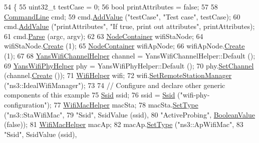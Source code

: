 \begin{DoxyCode}
54 \{
55   uint32\_t testCase = 0;
56   \textcolor{keywordtype}{bool} printAttributes = \textcolor{keyword}{false};
57 
58   \hyperlink{classns3_1_1CommandLine}{CommandLine} cmd;
59   cmd.\hyperlink{classns3_1_1CommandLine_addcfb546c7ad4c8bd0965654d55beb8e}{AddValue} (\textcolor{stringliteral}{"testCase"}, \textcolor{stringliteral}{"Test case"}, testCase);
60   cmd.\hyperlink{classns3_1_1CommandLine_addcfb546c7ad4c8bd0965654d55beb8e}{AddValue} (\textcolor{stringliteral}{"printAttributes"}, \textcolor{stringliteral}{"If true, print out attributes"}, printAttributes);
61   cmd.\hyperlink{classns3_1_1CommandLine_a5c10b85b3207e5ecb48d907966923156}{Parse} (argc, argv);
62 
63   \hyperlink{classns3_1_1NodeContainer}{NodeContainer} wifiStaNode;
64   wifiStaNode.\hyperlink{classns3_1_1NodeContainer_a787f059e2813e8b951cc6914d11dfe69}{Create} (1);
65   \hyperlink{classns3_1_1NodeContainer}{NodeContainer} wifiApNode;
66   wifiApNode.\hyperlink{classns3_1_1NodeContainer_a787f059e2813e8b951cc6914d11dfe69}{Create} (1);
67 
68   \hyperlink{classns3_1_1YansWifiChannelHelper}{YansWifiChannelHelper} channel = YansWifiChannelHelper::Default ();
69   \hyperlink{classns3_1_1YansWifiPhyHelper}{YansWifiPhyHelper} phy = YansWifiPhyHelper::Default ();
70   phy.\hyperlink{classns3_1_1YansWifiPhyHelper_ad2e9a27587dd4ff320435c93cc2676de}{SetChannel} (channel.\hyperlink{classns3_1_1YansWifiChannelHelper_a0532e292ab9452f3cf630c848708e563}{Create} ());
71   \hyperlink{classns3_1_1WifiHelper}{WifiHelper} wifi;
72   wifi.\hyperlink{classns3_1_1WifiHelper_a3d01b178aeb2de246ab5a3aa5638ce24}{SetRemoteStationManager} (\textcolor{stringliteral}{"ns3::IdealWifiManager"});
73 
74   \textcolor{comment}{// Configure and declare other generic components of this example}
75   \hyperlink{classns3_1_1Ssid}{Ssid} ssid;
76   ssid = \hyperlink{classns3_1_1Ssid}{Ssid} (\textcolor{stringliteral}{"wifi-phy-configuration"});
77   \hyperlink{classns3_1_1WifiMacHelper}{WifiMacHelper} macSta;
78   macSta.\hyperlink{classns3_1_1WifiMacHelper_a382d8df76a1dd7007179d1963b4b6bc6}{SetType} (\textcolor{stringliteral}{"ns3::StaWifiMac"},
79                   \textcolor{stringliteral}{"Ssid"}, SsidValue (ssid),
80                   \textcolor{stringliteral}{"ActiveProbing"}, \hyperlink{classns3_1_1BooleanValue}{BooleanValue} (\textcolor{keyword}{false}));
81   \hyperlink{classns3_1_1WifiMacHelper}{WifiMacHelper} macAp;
82   macAp.\hyperlink{classns3_1_1WifiMacHelper_a382d8df76a1dd7007179d1963b4b6bc6}{SetType} (\textcolor{stringliteral}{"ns3::ApWifiMac"},
83                  \textcolor{stringliteral}{"Ssid"}, SsidValue (ssid),

\end{DoxyCode}
